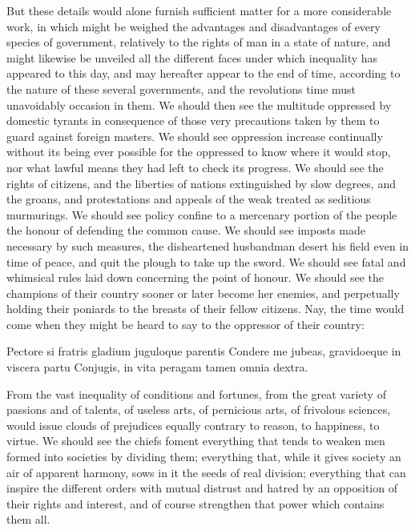 \documentclass[11pt,twocolumn]{ltugboat}
\begin{document}
But these details would alone furnish sufficient matter for a more
considerable work, in which might be weighed the advantages and
disadvantages of every species of government, relatively to the rights
of man in a state of nature, and might likewise be unveiled all the
different faces under which inequality has appeared to this day, and
may hereafter appear to the end of time, according to the nature of
these several governments, and the revolutions time must unavoidably
occasion in them. We should then see the multitude oppressed by
domestic tyrants in consequence of those very precautions taken by
them to guard against foreign masters. We should see oppression
increase continually without its being ever possible for the oppressed
to know where it would stop, nor what lawful means they had left to
check its progress. We should see the rights of citizens, and the
liberties of nations extinguished by slow degrees, and the groans, and
protestations and appeals of the weak treated as seditious murmurings.
We should see policy confine to a mercenary portion of the people the
honour of defending the common cause. We should see imposts made
necessary by such measures, the disheartened husbandman desert his
field even in time of peace, and quit the plough to take up the sword.
We should see fatal and whimsical rules laid down concerning the point
of honour. We should see the champions of their country sooner or
later become her enemies, and perpetually holding their poniards to
the breasts of their fellow citizens. Nay, the time would come when
they might be heard to say to the oppressor of their country:

  Pectore si fratris gladium juguloque parentis
  Condere me jubeas, gravidoeque in viscera partu
  Conjugis, in vita peragam tamen omnia dextra.

From the vast inequality of conditions and fortunes, from the great
variety of passions and of talents, of useless arts, of pernicious
arts, of frivolous sciences, would issue clouds of prejudices equally
contrary to reason, to happiness, to virtue. We should see the chiefs
foment everything that tends to weaken men formed into societies by
dividing them; everything that, while it gives society an air of
apparent harmony, sows in it the seeds of real division; everything
that can inspire the different orders with mutual distrust and hatred
by an opposition of their rights and interest, and of course
strengthen that power which contains them all.
\end{document}
